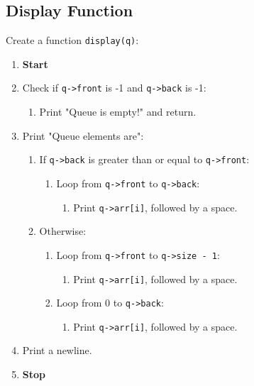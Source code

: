 {  \subsection{Display Function}
  Create a function \texttt{display(q)}:
  \begin{enumerate}[label=\arabic*:,left=0pt]
    \item \textbf{Start}
    \item Check if \texttt{q->front} is -1 and \texttt{q->back} is -1:
          \begin{enumerate}[label=2.\arabic*.]
            \item Print "Queue is empty!" and return.
          \end{enumerate}
    \item Print "Queue elements are":
          \begin{enumerate}[label=2.\arabic*.]
            \item If \texttt{q->back} is greater than or equal to \texttt{q->front}:
                  \begin{enumerate}[label=3.\arabic*.]
                    \item Loop from \texttt{q->front} to \texttt{q->back}:
                          \begin{enumerate}[label=4.\arabic*.]
                            \item Print \texttt{q->arr[i]}, followed by a space.
                          \end{enumerate}
                  \end{enumerate}
            \item Otherwise:
                  \begin{enumerate}[label=3.\arabic*.]
                    \item Loop from \texttt{q->front} to \texttt{q->size - 1}:
                          \begin{enumerate}[label=4.\arabic*.]
                            \item Print \texttt{q->arr[i]}, followed by a space.
                          \end{enumerate}
                    \item Loop from 0 to \texttt{q->back}:
                          \begin{enumerate}[label=4.\arabic*.]
                            \item Print \texttt{q->arr[i]}, followed by a space.
                          \end{enumerate}
                  \end{enumerate}
          \end{enumerate}
    \item Print a newline.
    \item \textbf{Stop}
  \end{enumerate}
 }
